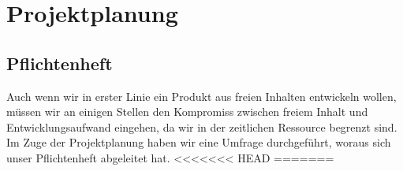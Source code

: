 %
%
%
%
\chapter{Projektplanung} \label{Projektplanung}
\section{Pflichtenheft} \label{Pflichtenheft}

Auch wenn wir in erster Linie ein Produkt aus freien Inhalten entwickeln wollen, müssen wir an einigen Stellen den Kompromiss zwischen freiem Inhalt und Entwicklungsaufwand eingehen, da wir in der zeitlichen Ressource begrenzt sind.
Im Zuge der Projektplanung haben wir eine Umfrage durchgeführt, woraus sich unser Pflichtenheft abgeleitet hat.
<<<<<<< HEAD
% 
% 	
% 	
% 	
% 
=======

